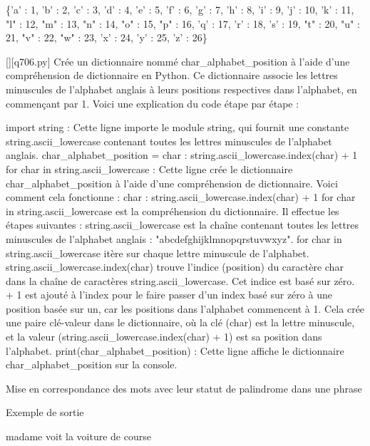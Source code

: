 \{'a' : 1, 'b' : 2, 'c' : 3, 'd' : 4, 'e' : 5, 'f' : 6, 'g' : 7, 'h' : 8, 'i' : 9, 'j' : 10, 'k' : 11, "l" : 12, "m" : 13, "n" : 14, "o" : 15, "p" : 16, 'q' : 17, 'r' : 18, 's' : 19, "t" : 20, "u" : 21, "v" : 22, "w" : 23, 'x' : 24, 'y' : 25, 'z' : 26\}
        \par
        \begin{solution}
            \renewcommand{\nomfichier}{q706.py}
            \pythonfile{\chemincode \nomfichier}[][\nomfichier]
            Crée un dictionnaire nommé char_alphabet_position à l'aide d'une compréhension de dictionnaire en Python. Ce dictionnaire associe les lettres minuscules de l'alphabet anglais à leurs positions respectives dans l'alphabet, en commençant par 1. Voici une explication du code étape par étape :

    import string : Cette ligne importe le module string, qui fournit une constante string.ascii_lowercase contenant toutes les lettres minuscules de l'alphabet anglais.
    char_alphabet_position = {char : string.ascii_lowercase.index(char) + 1 for char in string.ascii_lowercase} : Cette ligne crée le dictionnaire char_alphabet_position à l'aide d'une compréhension de dictionnaire. Voici comment cela fonctionne :
        {char : string.ascii_lowercase.index(char) + 1 for char in string.ascii_lowercase} est la compréhension du dictionnaire. Il effectue les étapes suivantes :
        string.ascii_lowercase est la chaîne contenant toutes les lettres minuscules de l'alphabet anglais : "abcdefghijklmnopqrstuvwxyz".
        for char in string.ascii_lowercase itère sur chaque lettre minuscule de l'alphabet.
        string.ascii_lowercase.index(char) trouve l'indice (position) du caractère char dans la chaîne de caractères string.ascii_lowercase. Cet indice est basé sur zéro.
        + 1 est ajouté à l'index pour le faire passer d'un index basé sur zéro à une position basée sur un, car les positions dans l'alphabet commencent à 1.
        Cela crée une paire clé-valeur dans le dictionnaire, où la clé (char) est la lettre minuscule, et la valeur (string.ascii_lowercase.index(char) + 1) est sa position dans l'alphabet.
    print(char_alphabet_position) : Cette ligne affiche le dictionnaire char_alphabet_position sur la console.
        \end{solution}
        

        \question
        Mise en correspondance des mots avec leur statut de palindrome dans une phrase

Exemple de sortie

madame voit la voiture de course

